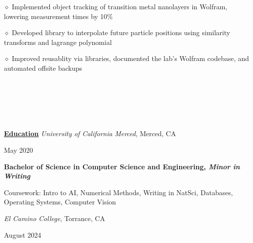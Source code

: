 \documentclass [11pt]{article}
\begin{document}
\begin{flushleft}
‭‭\quad\quad\quad$\diamond$ ‭Implemented object tracking of transition metal nanolayers in Wolfram, lowering measurement times by 10$\%$

‭‭\quad\quad\quad$\diamond$ Developed library to interpolate future particle positions using similarity transforms and lagrange polynomial

‭‭\quad\quad\quad$\diamond$ Improved reusablity via libraries, documented the lab’s Wolfram codebase, and automated offsite backups

\linebreak

‭‭%

‭‭%

‭‭%

\linebreak

\vspace{7}
\underline{\textbf{Education}}
\linebreak
\emph{University of California Merced}, Merced, CA\begin{minipage}{0.63 \linewidth}\begin{flushright}May 2020\end{flushright}\end{minipage}
\textbf{Bachelor of Science in Computer Science and Engineering, \emph{Minor in Writing}}

\raggedleft
\quad\quad\quad Coursework: Intro to AI, Numerical Methods, Writing in NatSci, Databases, Operating Systems, Computer Vision
\normalsize
\linebreak
\raggedright
\emph{El Camino College}, Torrance, CA\begin{minipage}{0.725 \linewidth}\begin{flushright}August 2024\end{flushright}\end{minipage}


\end{flushleft}
\end{document}
